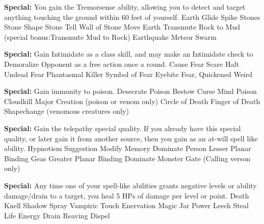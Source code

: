 \begin{multicols}{2}
\textbf{Special: }{You gain the Tremorsense ability, allowing you to detect and target anything touching the ground within 60 feet of yourself.}
\sphere
{Earth Glide}
{Spike Stones}
{Stone Shape}
{Stone Tell}
{Wall of Stone}
{Move Earth}
{Transmute Rock to Mud (special bonus:}{Transmute Mud to Rock)}
{Earthquake}
{Meteor Swarm}

\textbf{Special: }{Gain Intimidate as a class skill, and may make an Intimidate check to Demoralize Opponent as a free action once a round.}
\sphere
{Cause Fear}
{Scare}
{Halt Undead}
{Fear}
{Phantasmal Killer}
{Symbol of Fear}
{Eyebite}
{Fear, Quickened}
{Weird}

\textbf{Special: }{Gain immunity to poison.}
\sphere
{Desecrate}
{Poison}
{Bestow Curse}
{Mind Poison}
{Cloudkill}
{Major Creation (poison or venom only)}
{Circle of Death}
{Finger of Death}
{Shapechange (venomous creatures only)}

\textbf{Special: }{Gain the telepathy special quality. If you already have this special quality, or later gain it from another source, then you gain  as an at-will spell like ability.}
\sphere
{Hypnotism}
{Suggestion}
{Modify Memory}
{Dominate Person}
{Lesser Planar Binding}
{Geas}
{Greater Planar Binding}
{Dominate Monster}
{Gate (Calling verson only)}

\textbf{Special: }{Any time one of your spell-like abilities grants negative levels or ability damage/drain to a target, you heal 5 HPs of damage per level or point.}
\sphere
{Death Knell}
{Shadow Spray}
{Vampiric Touch}
{Enervation}
{Magic Jar}
{Power Leech}
{Steal Life}
{Energy Drain}
{Reaving Dispel}

\end{multicols}
